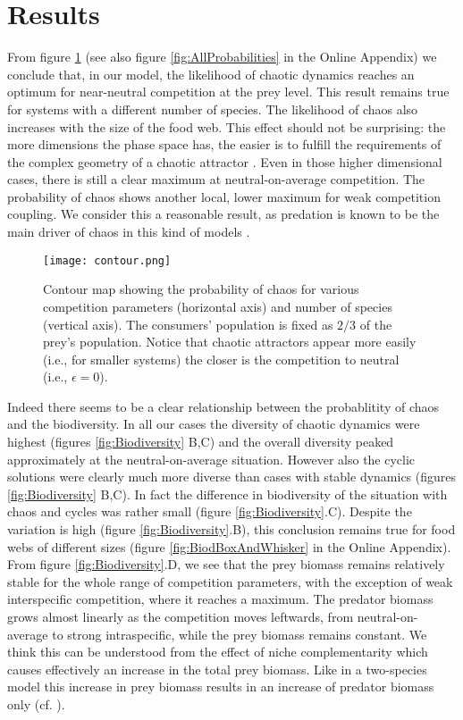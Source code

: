 \section{Results}
\label{sec:Results}
From figure \ref{fig:Contour} (see also figure \ref{fig:AllProbabilities} in the Online Appendix) we conclude that, in our model, the likelihood of chaotic dynamics reaches an optimum for near-neutral competition at the prey level. This result remains true for systems with a different number of species. The likelihood of chaos also increases with the size of the food web. This effect should not be surprising: the more dimensions the phase space has, the easier is to fulfill the requirements of the complex geometry of a chaotic attractor \citep{Strogatz1994}. Even in those higher dimensional cases, there is still a clear maximum at neutral-on-average competition. The probability of chaos shows another local, lower maximum for weak competition coupling. We consider this a reasonable result, as predation is known to be the main driver of chaos in this kind of models \citep{Scheffer2004}.

\begin{figure}
	\begin{center}
		\texttt{[image: contour.png]}
	\end{center}
	\caption{Contour map showing the probability of chaos for various competition parameters (horizontal axis) and number of species (vertical axis). The consumers' population is fixed as $ 2/3 $ of the prey's population. Notice that chaotic attractors appear more easily (i.e., for smaller systems) the closer is the competition to neutral (i.e., $ \epsilon = 0 $).}
	\label{fig:Contour}
\end{figure}

Indeed there seems to be a clear relationship between the probablitity of chaos and the biodiversity. In all our cases the diversity of chaotic dynamics were highest (figures \ref{fig:Biodiversity} B,C) and the overall diversity peaked approximately at the neutral-on-average situation. However also the cyclic solutions were clearly much more diverse than cases with stable dynamics (figures \ref{fig:Biodiversity} B,C). In fact the difference in biodiversity of the situation with chaos and cycles was rather small (figure \ref{fig:Biodiversity}.C). Despite the variation is high (figure \ref{fig:Biodiversity}.B), this conclusion remains true for food webs of different sizes (figure \ref{fig:BiodBoxAndWhisker} in the Online Appendix). From figure \ref{fig:Biodiversity}.D, we see that the prey biomass remains relatively stable for the whole range of competition parameters, with the exception of weak interspecific competition, where it reaches a maximum. The predator biomass grows almost linearly as the competition moves leftwards, from neutral-on-average to strong intraspecific, while the prey biomass remains constant. We think this can be understood from the effect of niche complementarity which causes effectively an increase in the total prey biomass. Like in a two-species model this increase in prey biomass results in an increase of predator biomass only (cf. \cite{Rosenzweig1963}).

